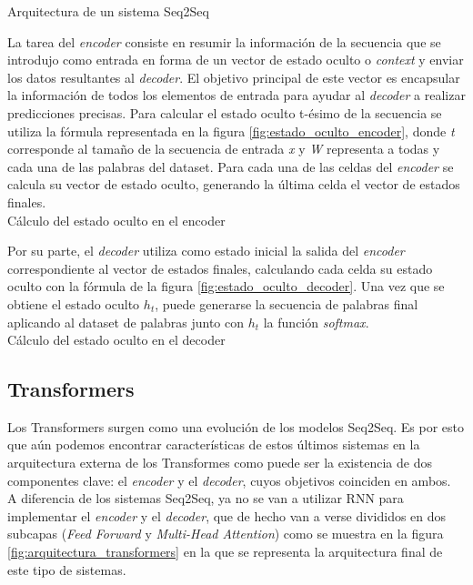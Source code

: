 %
{Arquitectura de un sistema Seq2Seq}

La tarea del \textit{encoder} consiste en resumir la información de la secuencia que se introdujo como entrada en forma de un vector de estado oculto o \textit{context} y enviar los datos resultantes al \textit{decoder}. El objetivo principal de este vector es encapsular la información de todos los elementos de entrada para ayudar al \textit{decoder} a realizar predicciones precisas. Para calcular el estado oculto t-ésimo de la secuencia se utiliza la fórmula representada en la figura \ref{fig:estado_oculto_encoder}, donde \textit{t} corresponde al tamaño de la secuencia de entrada \textit{x} y \textit{W} representa a todas y cada una de las palabras del dataset. Para cada una de las celdas del \textit{encoder} se calcula su vector de estado oculto, generando la última celda el vector de estados finales.\\

%
{Cálculo del estado oculto en el encoder}

Por su parte, el \textit{decoder} utiliza como estado inicial la salida del \textit{encoder} correspondiente al vector de estados finales, calculando cada celda su estado oculto con la fórmula de la figura \ref{fig:estado_oculto_decoder}. Una vez que se obtiene el estado oculto $h_{t}$, puede generarse la secuencia de palabras final aplicando al dataset de palabras junto con $h_{t}$ la función \textit{softmax}.\\

%
{Cálculo del estado oculto en el decoder}



\subsection{Transformers}
Los Transformers surgen como una evolución de los modelos Seq2Seq. Es por esto que aún podemos encontrar características de estos últimos sistemas en la arquitectura externa de los Transformes como puede ser la existencia de dos componentes clave: el \textit{encoder} y el \textit{decoder}, cuyos objetivos coinciden en ambos.\\

A diferencia de los sistemas Seq2Seq, ya no se van a utilizar RNN para implementar el \textit{encoder} y el \textit{decoder}, que de hecho van a verse divididos en dos subcapas (\textit{Feed Forward} y \textit{Multi-Head Attention}) como se muestra en la figura \ref{fig:arquitectura_transformers} en la que se representa la arquitectura final de este tipo de sistemas.\\

